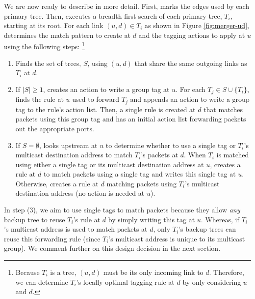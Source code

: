 We are now ready to describe \merge in more detail.  
First, \merge marks the edges used by each primary tree.  Then, \merge executes a breadth first search of each primary tree, $T_i$, starting at its root.  
For each link $(u,d) \in T_i$ as shown in Figure \ref{fig:merger-ud}, \merge determines the match pattern to create at $d$ and the tagging actions to apply at $u$ using the following steps:
\footnote{Because $T_i$ is a tree, $(u,d)$ must be its only incoming link to $d$.  Therefore, we can determine $T_i$'s locally optimal tagging rule at $d$ by only considering $u$ and $d$.}
\begin{enumerate}

	\item Finds the set of trees, $S$, using $(u,d)$ that share the same outgoing links as $T_i$ at $d$. 

	\item If $|S| \geq 1$, \merge creates an action to write a group tag at $u$.  For each $T_j \in S \cup \{T_i\}$, \merge finds the rule at $u$ used to forward $T_j$ and appends an action
	to write a group tag to the rule's action list.
	Then, a single rule is created at $d$ that matches packets using this group tag and has an initial action list forwarding packets out the appropriate ports. 

	\item If $S = \emptyset$, \merge looks upstream at $u$ to determine whether to use a single tag or $T_i$'s multicast destination address to match $T_i$'s packets at $d$. 
	When $T_i$ is matched using either a single tag or its multicast destination address at $u$, \merge creates a rule at $d$ to match packets using a single tag and writes this single
	tag at $u$.  Otherwise, \merge creates a rule at $d$ matching packets using $T_i$'s multicast destination address (no action is needed at $u$).  

\end{enumerate}
In step (3), we aim to use single tags to match packets because they allow \emph{any} backup tree to reuse $T_i$'s rule at $d$ by simply writing this tag at $u$.  
Whereas, if $T_i$'s multicast address is used to match packets at $d$, only $T_i$'s backup trees can reuse this forwarding rule (since $T_i$'s multicast address is unique to its multicast group).
We comment further on this design decision in the next section.

